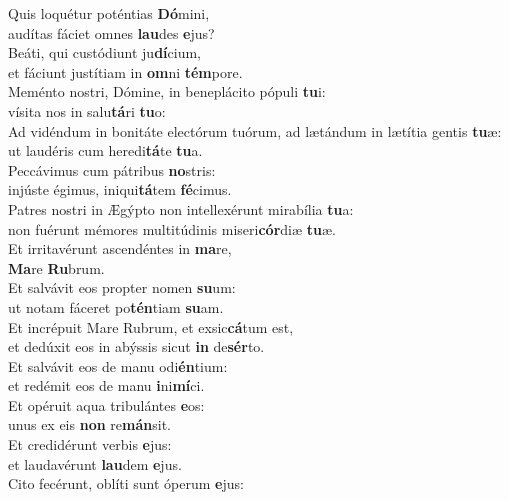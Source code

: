 \evenverse Quis loquétur poténtias \textbf{Dó}mini,~\*\\
\evenverse audítas fáciet omnes \textbf{lau}des \textbf{e}jus?\\
\oddverse Beáti, qui custódiunt ju\textbf{dí}cium,~\*\\
\oddverse et fáciunt justítiam in \textbf{om}ni \textbf{tém}pore.\\
\evenverse Meménto nostri, Dómine, in beneplácito pópuli \textbf{tu}i:~\*\\
\evenverse vísita nos in salu\textbf{tá}ri \textbf{tu}o:\\
\oddverse Ad vidéndum in bonitáte electórum tuórum, ad lætándum in lætítia gentis \textbf{tu}æ:~\*\\
\oddverse ut laudéris cum heredi\textbf{tá}te \textbf{tu}a.\\
\evenverse Peccávimus cum pátribus \textbf{no}stris:~\*\\
\evenverse injúste égimus, iniqui\textbf{tá}tem \textbf{fé}cimus.\\
\oddverse Patres nostri in Ægýpto non intellexérunt mirabília \textbf{tu}a:~\*\\
\oddverse non fuérunt mémores multitúdinis miseri\textbf{cór}diæ \textbf{tu}æ.\\
\evenverse Et irritavérunt ascendéntes in \textbf{ma}re,~\*\\
\evenverse \textbf{Ma}re \textbf{Ru}brum.\\
\oddverse Et salvávit eos propter nomen \textbf{su}um:~\*\\
\oddverse ut notam fáceret po\textbf{tén}tiam \textbf{su}am.\\
\evenverse Et incrépuit Mare Rubrum, et exsic\textbf{cá}tum est,~\*\\
\evenverse et dedúxit eos in abýssis sicut \textbf{in} de\textbf{sér}to.\\
\oddverse Et salvávit eos de manu odi\textbf{én}tium:~\*\\
\oddverse et redémit eos de manu \textbf{i}ni\textbf{mí}ci.\\
\evenverse Et opéruit aqua tribulántes \textbf{e}os:~\*\\
\evenverse unus ex eis \textbf{non} re\textbf{mán}sit.\\
\oddverse Et credidérunt verbis \textbf{e}jus:~\*\\
\oddverse et laudavérunt \textbf{lau}dem \textbf{e}jus.\\
\evenverse Cito fecérunt, oblíti sunt óperum \textbf{e}jus:~\*\\
